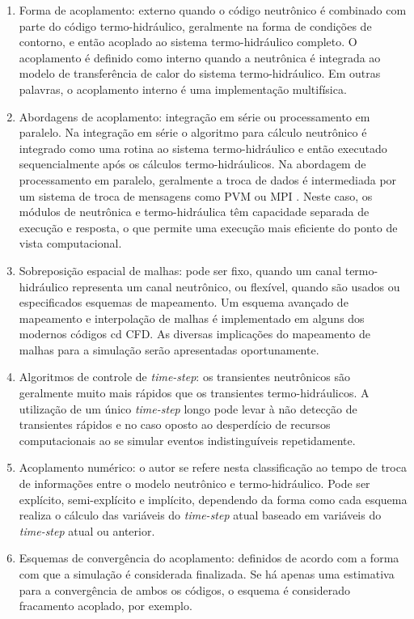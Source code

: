 \documentclass[12pt,openright,twoside,a4paper,english,french,spanish,brazil]{abntex2}
\begin{document}
\begin{enumerate}
\item Forma de acoplamento: externo quando o código neutrônico é combinado com parte do código termo-hidráulico, 
geralmente na forma de condições de contorno, e então acoplado ao sistema termo-hidráulico completo. O acoplamento 
é definido como interno quando a neutrônica é integrada ao modelo de transferência de calor do sistema termo-hidráulico. 
Em outras palavras, o acoplamento interno é uma implementação multifísica.
\item Abordagens de acoplamento: integração em série ou processamento em paralelo. Na integração em série o algoritmo 
para cálculo neutrônico é integrado como uma rotina ao sistema termo-hidráulico e então executado sequencialmente 
após os cálculos termo-hidráulicos. Na abordagem de processamento em paralelo, geralmente a troca de dados é 
intermediada por um sistema de troca de mensagens como PVM \cite{Geist94} ou MPI \cite{Quinn2004}. Neste caso, os 
módulos de neutrônica e termo-hidráulica têm capacidade separada de execução e resposta, o que permite uma execução 
mais eficiente do ponto de vista computacional.
\item Sobreposição espacial de malhas: pode ser fixo, quando um canal termo-hidráulico representa um canal neutrônico, 
ou flexível, quando são usados ou especificados esquemas de mapeamento. Um esquema avançado de mapeamento 
e interpolação de malhas \cite{Beaudoin2008} é implementado em alguns dos modernos códigos cd CFD. As diversas implicações 
do mapeamento de malhas para a simulação serão apresentadas oportunamente.
\item Algoritmos de controle de \textit{time-step}: os transientes neutrônicos são geralmente muito mais rápidos que 
os transientes termo-hidráulicos. A utilização de um único \textit{time-step} longo pode levar à não detecção de transientes 
rápidos e no caso oposto ao desperdício de recursos computacionais ao se simular eventos indistinguíveis repetidamente.
\item Acoplamento numérico: o autor se refere nesta classificação ao tempo de troca de informações entre o modelo 
neutrônico e termo-hidráulico. Pode ser explícito, semi-explícito e implícito, dependendo da forma como cada esquema 
realiza o cálculo das variáveis do \textit{time-step} atual baseado em variáveis do \textit{time-step} atual ou 
anterior.
\item Esquemas de convergência do acoplamento: definidos de acordo com a forma com que a simulação é considerada 
finalizada. Se há apenas uma estimativa para a convergência de ambos os códigos, o esquema é considerado fracamento 
acoplado, por exemplo.
\end{enumerate}
\end{document}
